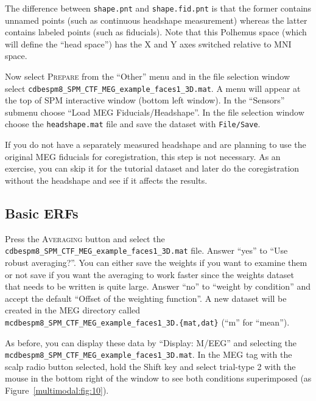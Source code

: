 The difference between \texttt{shape.pnt} and \texttt{shape.fid.pnt} is that the former contains unnamed points (such as continuous headshape measurement) whereas the latter contains labeled points (such as fiducials). Note that this Polhemus space (which will define the ``head space'') has the X and Y axes switched relative to MNI space.

Now select \textsc{Prepare} from the ``Other'' menu and in the file selection window select \texttt{cdbespm8\_\-SPM\_\-CTF\_\-MEG\_\-example\_\-faces1\_3D.mat}. A menu will appear at the top of SPM interactive window (bottom left window). In the ``Sensors'' submenu choose ``Load MEG Fiducials/Headshape''. In the file selection window choose the \texttt{headshape.mat} file and save the dataset with \texttt{File/Save}.

If you do not have a separately measured headshape and are planning to use the original MEG fiducials for coregistration, this step is not necessary. As an exercise, you can skip it for the tutorial dataset and later do the coregistration without the headshape and see if it affects the results.

\subsection{Basic ERFs} 

Press the \textsc{Averaging} button and select the \texttt{cdbespm8\_SPM\_CTF\_MEG\_example\_faces1\_3D.mat} file. Answer ``yes'' to ``Use robust averaging?''. You can either save the weights if you want to examine them or not save if you want the averaging to work faster since the weights dataset that needs to be written is quite large. Answer ``no'' to ``weight by condition'' and accept the default ``Offset of the weighting function''. A new dataset will be created in the MEG directory called \texttt{mcdbespm8\_SPM\_CTF\_MEG\_example\_faces1\_3D.\{mat,dat\}} (``m'' for ``mean'').

As before, you can display these data by ``Display: M/EEG'' and selecting the \texttt{mcdbespm8\_\-SPM\_\-CTF\_\-MEG\_\-example\_\-faces1\_3D.mat}. In the MEG tag with the scalp radio button selected, hold the Shift key and select trial-type 2 with the mouse in the bottom right of the window to see both conditions superimposed (as Figure~\ref{multimodal:fig:10}).

